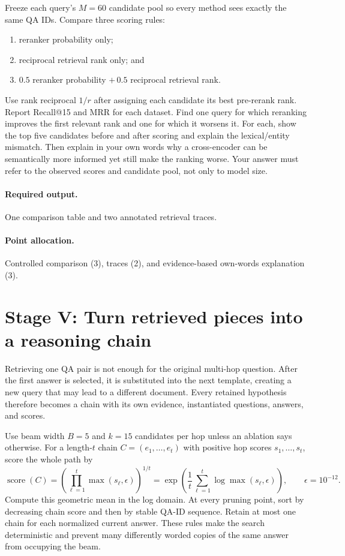 \documentclass[11pt]{article}
\newcommand{\deliverables}{\paragraph{Required output.}}
\newcommand{\grading}{\paragraph{Point allocation.}}
\begin{document}
Freeze each query's $M=60$ candidate pool so every method sees exactly the same
QA IDs. Compare three scoring rules:
\begin{enumerate}[label=(\roman*)]
  \item reranker probability only;
  \item reciprocal retrieval rank only; and
  \item $0.5$ reranker probability $+\,0.5$ reciprocal retrieval rank.
\end{enumerate}
Use rank reciprocal $1/r$ after assigning each candidate its best pre-rerank
rank. Report Recall@15 and MRR for each dataset. Find one query for which
reranking improves the first relevant rank and one for which it worsens it.
For each, show the top five candidates before and after scoring and explain the
lexical/entity mismatch. Then explain in your own words why a cross-encoder can
be semantically more informed yet still make the ranking worse. Your answer
must refer to the observed scores and candidate pool, not only to model size.

\deliverables One comparison table and two annotated retrieval traces.

\grading Controlled comparison (3), traces (2), and evidence-based own-words
explanation (3).

\section{Stage V: Turn retrieved pieces into a reasoning chain}

Retrieving one QA pair is not enough for the original multi-hop question.
After the first answer is selected, it is substituted into the next template,
creating a new query that may lead to a different document. Every retained
hypothesis therefore becomes a chain with its own evidence, instantiated
questions, answers, and scores.

Use beam width $B=5$ and $k=15$ candidates per hop unless an ablation says
otherwise. For a length-$t$ chain $C=(e_1,\ldots,e_t)$ with positive hop
scores $s_1,\ldots,s_t$, score the whole path by
\begin{equation}
  \operatorname{score}(C)
  = \left(\prod_{\ell=1}^{t}\max(s_\ell,\epsilon)\right)^{1/t}
  = \exp\left(\frac{1}{t}\sum_{\ell=1}^{t}
    \log\max(s_\ell,\epsilon)\right),
  \qquad \epsilon=10^{-12}.
\end{equation}
Compute this geometric mean in the log domain. At every pruning point, sort
by decreasing chain score and then by stable QA-ID sequence. Retain at most
one chain for each normalized current answer. These rules make the search
deterministic and prevent many differently worded copies of the same answer
from occupying the beam.
\end{document}
